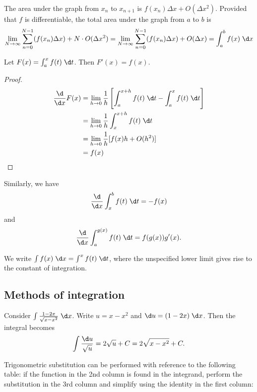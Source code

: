 \documentclass[a4paper]{article}
\begin{document}
  The area under the graph from $x_n$ to $x_{n+1}$ is $f(x_n)\Delta x + O(\Delta x^2)$. Provided that $f$ is differentiable, the total area under the graph from $a$ to $b$ is
  \[
    \lim_{N\to \infty} \sum_{n=0}^{N-1}(f(x_n)\Delta x) + N\cdot O(\Delta x^2) = \lim_{N\to \infty} \sum_{n=0}^{N-1}(f(x_n)\Delta x) + O(\Delta x) = \int_a^b f(x)\;\d x
  \]
  \begin{thm}
    Let $F(x) = \int_a^x f(t)\;\d t$. Then $F'(x) = f(x)$.
  \end{thm}

  \begin{proof}
    \begin{align*}
      \frac{\d}{\d x}F(x) &= \lim_{h\to 0}\frac{1}{h}\left[\int_a^{x+h}f(t)\;\d t - \int_a^x f(t)\;\d t\right]\\
      &= \lim_{h\to 0} \frac{1}{h}\int_x^{x+h}f(t) \;\d t\\
      &= \lim_{h\to 0} \frac{1}{h}[f(x)h + O(h^2)]\\
      &= f(x)
    \end{align*}
  \end{proof}
  Similarly, we have 
  \[
    \frac{\d}{\d x}\int_x^b f(t)\;\d t = -f(x)
  \]
  and
  \[
    \frac{\d}{\d x}\int_a^{g(x)} f(t)\;\d t = f(g(x))g'(x).
  \]

  \begin{notation}
    We write $\int f(x)\;\d x= \int^x f(t)\;\d t$, where the unspecified lower limit gives rise to the constant of integration.
  \end{notation}

  \subsection{Methods of integration}
  \begin{eg}
    Consider $\int \frac{1 - 2x}{\sqrt{x - x^2}}\;\d x$. Write $u = x - x^2$ and $\d u = (1 - 2x)\;\d x$. Then the integral becomes
    \[
      \int \frac{\d u}{\sqrt{u}} = 2\sqrt{u} + C = 2\sqrt{x - x^2} + C.
    \]
  \end{eg}

  Trigonometric substitution can be performed with reference to the following table: if the function in the 2nd column is found in the integrand, perform the substitution in the 3rd column and simplify using the identity in the first column:
\end{document}
